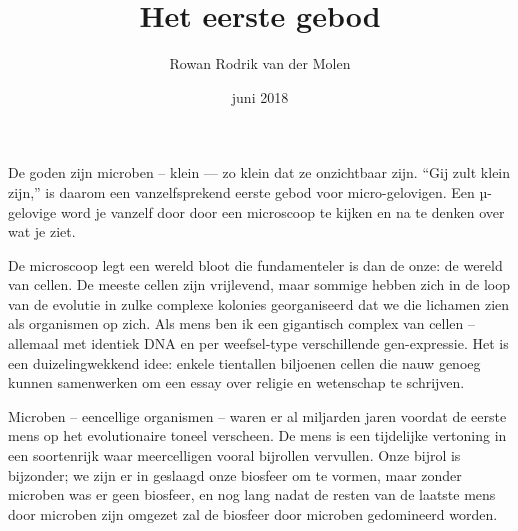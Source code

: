 \documentclass[12pt,a4paper]{article}
\begin{document}
\title{Het eerste gebod}
\author{Rowan Rodrik van der Molen}
\date{juni 2018}
\maketitle




De goden zijn microben – klein — zo klein dat ze onzichtbaar zijn. “Gij zult klein zijn,” is daarom een vanzelfsprekend eerste gebod voor micro-gelovigen. Een µ-gelovige word je vanzelf door door een microscoop te kijken en na te denken over wat je ziet.

De microscoop legt een wereld bloot die fundamenteler is dan de onze: de wereld van cellen. De meeste cellen zijn vrijlevend, maar sommige hebben zich in de loop van de evolutie in zulke complexe kolonies georganiseerd dat we die lichamen zien als organismen op zich. Als mens ben ik een gigantisch complex van cellen – allemaal met identiek DNA en per weefsel-type verschillende gen-expressie. Het is een duizelingwekkend idee: enkele tientallen biljoenen cellen die nauw genoeg kunnen samenwerken om een essay over religie en wetenschap te schrijven.


Microben – eencellige organismen – waren er al miljarden jaren voordat de eerste mens op het evolutionaire toneel verscheen. De mens is een tijdelijke vertoning in een soortenrijk waar meercelligen vooral bijrollen vervullen. Onze bijrol is bijzonder; we zijn er in geslaagd onze biosfeer om te vormen, maar zonder microben was er geen biosfeer, en nog lang nadat de resten van de laatste mens door microben zijn omgezet zal de biosfeer door microben gedomineerd worden.
\end{document}
